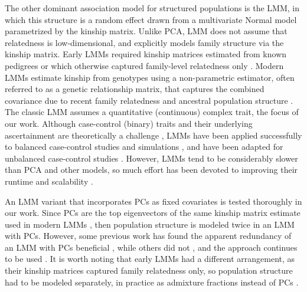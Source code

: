 \documentclass[11pt]{article}
\begin{document}
The other dominant association model for structured populations is the LMM, in which this structure is a random effect drawn from a multivariate Normal model parametrized by the kinship matrix.
Unlike PCA, LMM does not assume that relatedness is low-dimensional, and explicitly models family structure via the kinship matrix.
Early LMMs required kinship matrices estimated from known pedigrees or which otherwise captured family-level relatedness only \citep{yu_unified_2006, zhao_arabidopsis_2007}.
Modern LMMs estimate kinship from genotypes using a non-parametric estimator, often referred to as a genetic relationship matrix, that captures the combined covariance due to recent family relatedness and ancestral population structure \citep{kang_efficient_2008, astle_population_2009, ochoa_estimating_2021}.
The classic LMM assumes a quantitative (continuous) complex trait, the focus of our work.
Although case-control (binary) traits and their underlying ascertainment are theoretically a challenge \citep{yang_advantages_2014}, LMMs have been applied successfully to balanced case-control studies \citep{astle_population_2009, kang_variance_2010} and simulations \citep{price_new_2010, wu_comparison_2011, sul_mixed_2013}, and have been adapted for unbalanced case-control studies \citep{zhou_efficiently_2018}.
However, LMMs tend to be considerably slower than PCA and other models, so much effort has been devoted to improving their runtime and scalability \citep{aulchenko_genomewide_2007, kang_efficient_2008, kang_variance_2010, zhang_mixed_2010, lippert_fast_2011, yang_gcta:_2011, listgarten_improved_2012, zhou_genome-wide_2012, svishcheva_rapid_2012, loh_efficient_2015, zhou_efficiently_2018}.

An LMM variant that incorporates PCs as fixed covariates is tested thoroughly in our work.
Since PCs are the top eigenvectors of the same kinship matrix estimate used in modern LMMs \citep{astle_population_2009, hoffman_correcting_2013}, then population structure is modeled twice in an LMM with PCs.
However, some previous work has found the apparent redundancy of an LMM with PCs beneficial \citep{price_new_2010, tucker_improving_2014}, while others did not \citep{liu_controlling_2011}, and the approach continues to be used \citep{zeng_signatures_2018}.
It is worth noting that early LMMs had a different arrangement, as their kinship matrices captured family relatedness only, so population structure had to be modeled separately, in practice as admixture fractions instead of PCs \citep{yu_unified_2006, zhao_arabidopsis_2007}.
\end{document}
